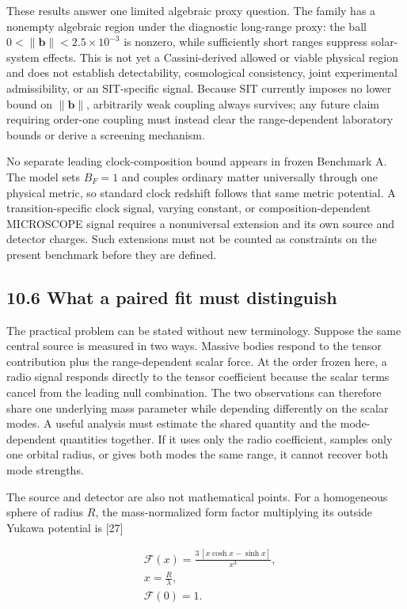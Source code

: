\documentclass[
  american,
  11pt,
  letterpaper,
]{article}
\newcounter{none} %
\begin{document}
These results answer one limited algebraic proxy question. The family has a nonempty algebraic region under the diagnostic long-range proxy: the ball \(0<\|\mathbf b\|<2.5\times10^{-3}\) is nonzero, while sufficiently short ranges suppress solar-system effects. This is not yet a Cassini-derived allowed or viable physical region and does not establish detectability, cosmological consistency, joint experimental admissibility, or an SIT-specific signal. Because SIT currently imposes no lower bound on \(\|\mathbf b\|\), arbitrarily weak coupling always survives; any future claim requiring order-one coupling must instead clear the range-dependent laboratory bounds or derive a screening mechanism.

No separate leading clock-composition bound appears in frozen Benchmark A. The model sets \(B_F=1\) and couples ordinary matter universally through one physical metric, so standard clock redshift follows that same metric potential. A transition-specific clock signal, varying constant, or composition-dependent MICROSCOPE signal requires a nonuniversal extension and its own source and detector charges. Such extensions must not be counted as constraints on the present benchmark before they are defined.

\subsection{10.6 What a paired fit must distinguish}\label{what-a-paired-fit-must-distinguish}

The practical problem can be stated without new terminology. Suppose the same central source is measured in two ways. Massive bodies respond to the tensor contribution plus the range-dependent scalar force. At the order frozen here, a radio signal responds directly to the tensor coefficient because the scalar terms cancel from the leading null combination. The two observations can therefore share one underlying mass parameter while depending differently on the scalar modes. A useful analysis must estimate the shared quantity and the mode-dependent quantities together. If it uses only the radio coefficient, samples only one orbital radius, or gives both modes the same range, it cannot recover both mode strengths.

The source and detector are also not mathematical points. For a homogeneous sphere of radius \(R\), the mass-normalized form factor multiplying its outside Yukawa potential is {[}27{]}

\begin{equation}
\begin{aligned}
& \mathcal F(x)
=\frac{3\,[x\cosh x-\sinh x]}{x^3}, \\
& x=\frac{R}{\lambda}, \\
& \mathcal F(0)=1 .
\end{aligned}
\tag{47}
\end{equation}
\end{document}
